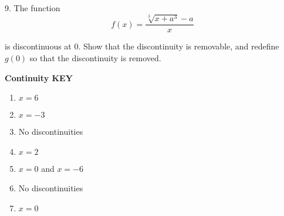 \documentclass{article}
\begin{document}
9. The function
\[
f(x) = \frac{\sqrt[3]{x+a^3}-a}{x}
\]

is discontinuous at 0. Show that the discontinuity is removable, and redefine $g(0)$ so that the discontinuity is removed.


\newpage


\textbf{Continuity KEY}


\begin{enumerate}
    \item $x = 6$
    \item $x = -3$
    \item No discontinuities
    \item $x = 2$
    \item $x = 0$ and $x = -6$
    \item No discontinuities
    \item $x = 0$
\end{enumerate}
\end{document}
